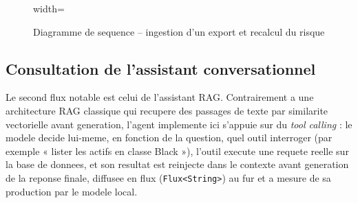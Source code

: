 \begin{figure}[H]
\begin{adjustbox}{width=\textwidth}
\end{adjustbox}
\caption{Diagramme de sequence -- ingestion d'un export et recalcul du risque}
\label{fig:seq-ingestion}
\end{figure}

\subsection{Consultation de l'assistant conversationnel}

Le second flux notable est celui de l'assistant RAG. Contrairement a une architecture
RAG classique qui recupere des passages de texte par similarite vectorielle avant
generation, l'agent implemente ici s'appuie sur du \emph{tool calling} : le modele
decide lui-meme, en fonction de la question, quel outil interroger (par exemple
« lister les actifs en classe Black »), l'outil execute une requete reelle sur la
base de donnees, et son resultat est reinjecte dans le contexte avant generation de
la reponse finale, diffusee en flux (\texttt{Flux<String>}) au fur et a mesure de sa
production par le modele local.

